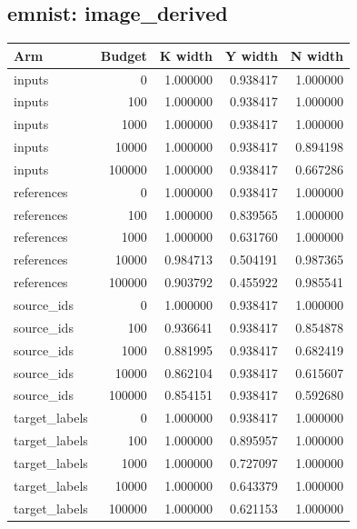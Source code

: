 \reservetable
\subsection{emnist: image\_derived}

\begingroup\small
\setlength{\tabcolsep}{4pt}
\begin{longtable}{lrrrr}
\toprule

Arm & Budget & K width & Y width & N width\\\midrule\endhead

inputs & 0 & 1.000000 & 0.938417 & 1.000000\\

inputs & 100 & 1.000000 & 0.938417 & 1.000000\\

inputs & 1000 & 1.000000 & 0.938417 & 1.000000\\

inputs & 10000 & 1.000000 & 0.938417 & 0.894198\\

inputs & 100000 & 1.000000 & 0.938417 & 0.667286\\

references & 0 & 1.000000 & 0.938417 & 1.000000\\

references & 100 & 1.000000 & 0.839565 & 1.000000\\

references & 1000 & 1.000000 & 0.631760 & 1.000000\\

references & 10000 & 0.984713 & 0.504191 & 0.987365\\

references & 100000 & 0.903792 & 0.455922 & 0.985541\\

source\_ids & 0 & 1.000000 & 0.938417 & 1.000000\\

source\_ids & 100 & 0.936641 & 0.938417 & 0.854878\\

source\_ids & 1000 & 0.881995 & 0.938417 & 0.682419\\

source\_ids & 10000 & 0.862104 & 0.938417 & 0.615607\\

source\_ids & 100000 & 0.854151 & 0.938417 & 0.592680\\

target\_labels & 0 & 1.000000 & 0.938417 & 1.000000\\

target\_labels & 100 & 1.000000 & 0.895957 & 1.000000\\

target\_labels & 1000 & 1.000000 & 0.727097 & 1.000000\\

target\_labels & 10000 & 1.000000 & 0.643379 & 1.000000\\

target\_labels & 100000 & 1.000000 & 0.621153 & 1.000000\\

\bottomrule
\end{longtable}
\endgroup


